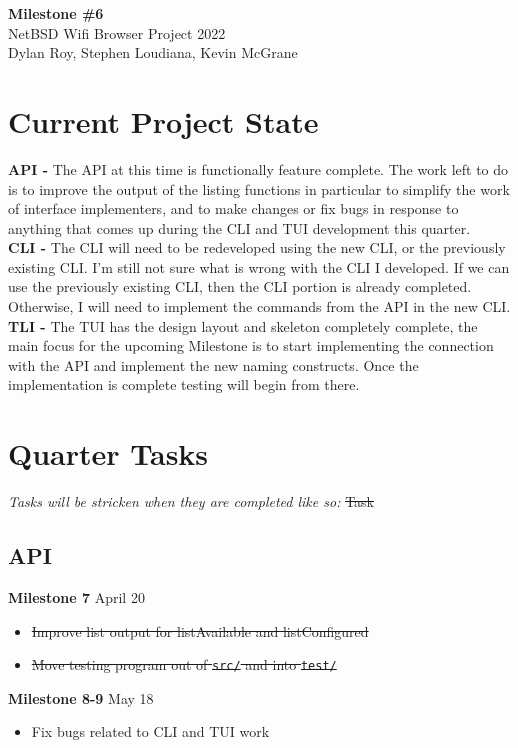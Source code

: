 \documentclass[11pt]{article}
\begin{document}
\begin{center}
  \textbf{\Large Milestone \#6}\\\large NetBSD Wifi Browser Project 2022\\
  Dylan Roy, Stephen Loudiana, Kevin McGrane
\end{center}


\section*{Current Project State}
\textbf{API -} The API at this time is functionally feature complete.
The work left to do is to improve the output of the listing functions in
particular to simplify the work of interface implementers, and to make
changes or fix bugs in response to anything that comes up during the CLI
and TUI development this quarter.\\

\textbf{CLI -} The CLI will need to be redeveloped using the new CLI, or the 
previously existing CLI. I'm still not sure what is wrong with the CLI I developed.
If we can use the previously existing CLI, then the CLI portion is already completed. 
Otherwise, I will need to implement the commands from the API in the new CLI. \\

\textbf{TLI -} The TUI has the design layout and skeleton completely complete, 
the main focus for the upcoming Milestone is to start implementing the connection 
with the API and implement the new naming constructs. Once the implementation 
is complete testing will begin from there. \\

\section*{Quarter Tasks}

\textit{Tasks will be stricken when they are completed like so:} \sout{Task}

\subsection*{API}
\textbf{Milestone 7} April 20
\begin{itemize}
  \item\sout{Improve list output for listAvailable and listConfigured}
  \item\sout{Move testing program out of \texttt{src/} and into \texttt{test/}}
\end{itemize}
\textbf{Milestone 8-9} May 18
\begin{itemize}
  \item Fix bugs related to CLI and TUI work
\end{itemize}
\end{document}
